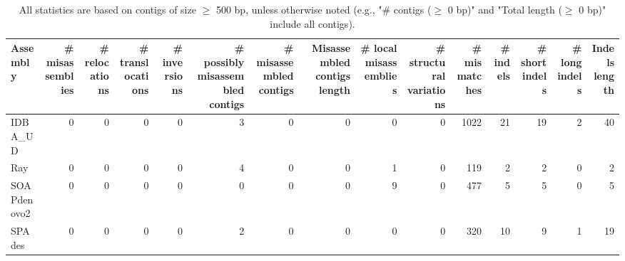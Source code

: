 \documentclass[12pt,a4paper]{article}
\begin{document}
\begin{table}[ht]
\begin{center}
\caption{All statistics are based on contigs of size $\geq$ 500 bp, unless otherwise noted (e.g., "\# contigs ($\geq$ 0 bp)" and "Total length ($\geq$ 0 bp)" include all contigs).}
\begin{tabular}{|l*{14}{|r}|}
\hline
Assembly & \# misassemblies &     \# relocations &     \# translocations &     \# inversions & \# possibly misassembled contigs & \# misassembled contigs & Misassembled contigs length & \# local misassemblies & \# structural variations & \# mismatches & \# indels &     \# short indels &     \# long indels & Indels length \\ \hline
IDBA\_UD & 0 & 0 & 0 & 0 & 3 & 0 & 0 & 0 & 0 & 1022 & 21 & 19 & 2 & 40 \\ \hline
Ray & 0 & 0 & 0 & 0 & 4 & 0 & 0 & 1 & 0 & 119 & 2 & 2 & 0 & 2 \\ \hline
SOAPdenovo2 & 0 & 0 & 0 & 0 & 0 & 0 & 0 & 9 & 0 & 477 & 5 & 5 & 0 & 5 \\ \hline
SPAdes & 0 & 0 & 0 & 0 & 2 & 0 & 0 & 0 & 0 & 320 & 10 & 9 & 1 & 19 \\ \hline
\end{tabular}
\end{center}
\end{table}
\end{document}
